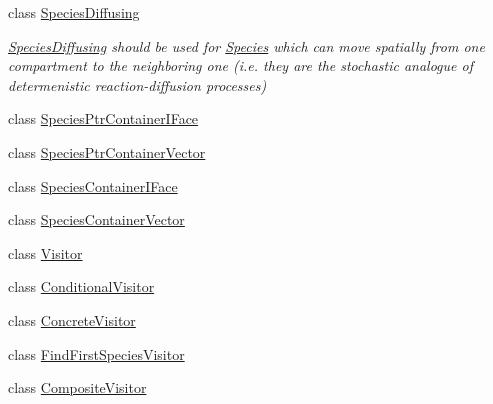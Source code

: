 \begin{DoxyCompactItemize}
class \hyperlink{classchem_1_1SpeciesDiffusing}{Species\-Diffusing}
\begin{DoxyCompactList}\small\item\em \hyperlink{classchem_1_1SpeciesDiffusing}{Species\-Diffusing} should be used for \hyperlink{classchem_1_1Species}{Species} which can move spatially from one compartment to the neighboring one (i.\-e. they are the stochastic analogue of determenistic reaction-\/diffusion processes) \end{DoxyCompactList}\item 
class \hyperlink{classchem_1_1SpeciesPtrContainerIFace}{Species\-Ptr\-Container\-I\-Face}
\item 
class \hyperlink{classchem_1_1SpeciesPtrContainerVector}{Species\-Ptr\-Container\-Vector}
\item 
class \hyperlink{classchem_1_1SpeciesContainerIFace}{Species\-Container\-I\-Face}
\item 
class \hyperlink{classchem_1_1SpeciesContainerVector}{Species\-Container\-Vector}
\item 
class \hyperlink{classchem_1_1Visitor}{Visitor}
\item 
class \hyperlink{classchem_1_1ConditionalVisitor}{Conditional\-Visitor}
\item 
class \hyperlink{classchem_1_1ConcreteVisitor}{Concrete\-Visitor}
\item 
class \hyperlink{classchem_1_1FindFirstSpeciesVisitor}{Find\-First\-Species\-Visitor}
\item 
class \hyperlink{classchem_1_1CompositeVisitor}{Composite\-Visitor}
\end{DoxyCompactItemize}
